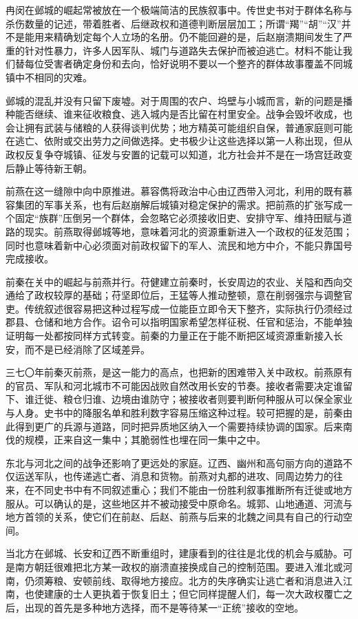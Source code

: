 冉闵在邺城的崛起常被放在一个极端简洁的民族叙事中。传世史书对于群体名称与杀伤数量的记述，带着胜者、后继政权和道德判断层层加工；所谓“羯”“胡”“汉”并不是能用来精确划定每个人立场的名册。仍不能回避的是，后赵崩溃期间发生了严重的针对性暴力，许多人因军队、城门与道路失去保护而被迫逃亡。材料不能让我们替每位受害者确定身份和去向，恰好说明不要以一个整齐的群体故事覆盖不同城镇中不相同的灾难。

邺城的混乱并没有只留下废墟。对于周围的农户、坞壁与小城而言，新的问题是播种能否继续、谁来征收粮食、逃入城内是否比留在村里安全。战争会毁坏收成，也会让拥有武装与储粮的人获得谈判优势；地方精英可能组织自保，普通家庭则可能在逃亡、依附或交出劳力之间做选择。史书极少让这些选择以第一人称出现，但从政权反复争夺城镇、征发与安置的记载可以知道，北方社会并不是在一场宫廷政变后静止等待新王朝。

前燕在这一缝隙中向中原推进。慕容儁将政治中心由辽西带入河北，利用的既有慕容集团的军事关系，也有后赵崩解后城镇对稳定保护的需求。把前燕的扩张写成一个固定“族群”压倒另一个群体，会忽略它必须接收旧吏、安排守军、维持田赋与道路的现实。前燕取得邺城等地，意味着河北的资源重新进入一个政权的征发范围；同时也意味着新中心必须面对前政权留下的军人、流民和地方中介，不能只靠国号完成接收。

前秦在关中的崛起与前燕并行。苻健建立前秦时，长安周边的农业、关隘和西向交通给了政权较厚的基础；苻坚即位后，王猛等人推动整顿，意在削弱强宗与调整官吏。传统叙述很容易把这种过程写成一位能臣立即令天下整齐，实际执行仍须经过郡县、仓储和地方合作。诏令可以指明国家希望怎样征税、任官和惩治，不能单独证明每一处都按同样方式转变。前秦的力量正在于能不断把区域资源重新接入长安，而不是已经消除了区域差异。

三七〇年前秦灭前燕，是这一能力的高点，也把新的困难带入关中政权。前燕原有的官员、军队和河北城市不可能因战败自然改用长安的节奏。接收者需要决定谁留下、谁迁徙、粮仓归谁、边境由谁防守；被接收者则要判断何种服从可以保全家业与人身。史书中的降服名单和胜利数字容易压缩这种过程。较可把握的是，前秦由此得到更广的兵源与道路，同时把异质地区纳入一个需要持续协调的国家。后来南伐的规模，正来自这一集中；其脆弱性也埋在同一集中之中。

东北与河北之间的战争还影响了更远处的家庭。辽西、幽州和高句丽方向的道路不仅运送军队，也传递逃亡者、消息和货物。前燕对丸都的进攻、同周边势力的往来，在不同史书中有不同叙述重心；我们不能由一份胜利叙事推断所有迁徙或地方服从。可以确认的是，这些地区并不被动接受中原命名。城郭、山地通道、河流与地方首领的关系，使它们在前赵、后赵、前燕与后来的北魏之间具有自己的行动空间。

当北方在邺城、长安和辽西不断重组时，建康看到的往往是北伐的机会与威胁。可是南方朝廷很难把北方某一政权的崩溃直接换成自己的控制范围。要进入淮北或河南，仍须筹粮、安顿前线、取得地方接应。北方的失序确实让逃亡者和消息进入江南，也使建康的士人更执着于恢复旧土；但它同样提醒人们，每一次大政权覆亡之后，出现的首先是多种地方选择，而不是等待某一“正统”接收的空地。

